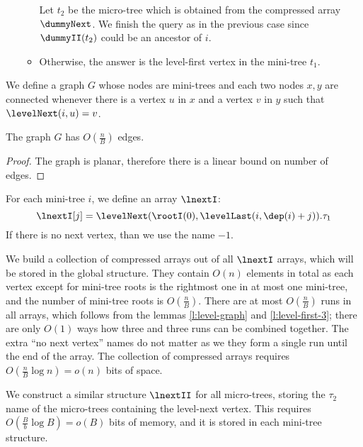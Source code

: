 \begin{enumerate}
\begin{itemize}
		Let $t_2$ be the micro-tree which is obtained from the compressed array $\dummyNext$.
		We finish the query as in the previous case since $\dummyII(t_2)$ could be an ancestor of $i$.
		
		\item Otherwise, the answer is the level-first vertex in the mini-tree $t_1$.
	\end{itemize}
\end{enumerate}

We define a graph $G$ whose nodes are mini-trees and each two nodes $x, y$ are connected whenever there is a vertex $u$ in $x$ and a vertex $v$ in $y$ such that $\levelNext(i, u) = v$.

\begin{lemma}\label{l:level-graph}
	The graph $G$ has $O(\frac{n}{B})$ edges.
\end{lemma}
\begin{proof}
	The graph is planar, therefore there is a linear bound on number of edges.
\end{proof}

For each mini-tree $i$, we define an array $\lnextI$:
$$ \lnextI[j] = \levelNext(\rootI(0), \levelLast(i, \dep(i) + j)).\tau_1$$
If there is no next vertex, than we use the name $-1$.

We build a collection of compressed arrays out of all $\lnextI$ arrays, which will be stored in the global structure.
They contain $O(n)$ elements in total as each vertex except for mini-tree roots is the rightmost one in at most one mini-tree, and the number of mini-tree roots is $O(\frac{n}{B})$.
There are at most $O(\frac{n}{B})$ runs in all arrays, which follows from the lemmas \ref{l:level-graph} and \ref{l:level-first-3}; there are only $O(1)$ ways how three and three runs can be combined together.
The extra ``no next vertex'' names do not matter as we they form a single run until the end of the array.
The collection of compressed arrays requires $O(\frac{n}{B} \log n) = o(n)$ bits of space.

We construct a similar structure $\lnextII$ for all micro-trees, storing the $\tau_2$ name of the micro-trees containing the level-next vertex.
This requires $O(\frac{B}{b} \log B) = o(B)$ bits of memory, and it is stored in each mini-tree structure.

